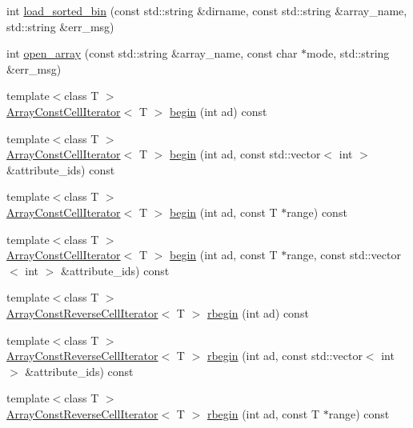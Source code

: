 \begin{DoxyCompactItemize}
\item 
int \hyperlink{classStorageManager_aa684003b8c78c5b6a13522cf47d6c7cb}{load\+\_\+sorted\+\_\+bin} (const std\+::string \&dirname, const std\+::string \&array\+\_\+name, std\+::string \&err\+\_\+msg)
\item 
int \hyperlink{classStorageManager_a566e1872beefb0b08364d03a0e82f4a7}{open\+\_\+array} (const std\+::string \&array\+\_\+name, const char $\ast$mode, std\+::string \&err\+\_\+msg)
\item 
{\footnotesize template$<$class T $>$ }\\\hyperlink{classArrayConstCellIterator}{Array\+Const\+Cell\+Iterator}$<$ T $>$ \hyperlink{classStorageManager_a4937c8bb623728447a003968edb55ce5}{begin} (int ad) const 
\item 
{\footnotesize template$<$class T $>$ }\\\hyperlink{classArrayConstCellIterator}{Array\+Const\+Cell\+Iterator}$<$ T $>$ \hyperlink{classStorageManager_a5af14b46b015d01b6a113edb781ccd38}{begin} (int ad, const std\+::vector$<$ int $>$ \&attribute\+\_\+ids) const 
\item 
{\footnotesize template$<$class T $>$ }\\\hyperlink{classArrayConstCellIterator}{Array\+Const\+Cell\+Iterator}$<$ T $>$ \hyperlink{classStorageManager_a11958acbf3550a0b6e9ca8b028b76889}{begin} (int ad, const T $\ast$range) const 
\item 
{\footnotesize template$<$class T $>$ }\\\hyperlink{classArrayConstCellIterator}{Array\+Const\+Cell\+Iterator}$<$ T $>$ \hyperlink{classStorageManager_aa32e07289e6803e99e835330afbec0de}{begin} (int ad, const T $\ast$range, const std\+::vector$<$ int $>$ \&attribute\+\_\+ids) const 
\item 
{\footnotesize template$<$class T $>$ }\\\hyperlink{classArrayConstReverseCellIterator}{Array\+Const\+Reverse\+Cell\+Iterator}$<$ T $>$ \hyperlink{classStorageManager_af4ce673fdf84d4672ff065743614078d}{rbegin} (int ad) const 
\item 
{\footnotesize template$<$class T $>$ }\\\hyperlink{classArrayConstReverseCellIterator}{Array\+Const\+Reverse\+Cell\+Iterator}$<$ T $>$ \hyperlink{classStorageManager_a9037e3c1521b947eeabee8961e392419}{rbegin} (int ad, const std\+::vector$<$ int $>$ \&attribute\+\_\+ids) const 
\item 
{\footnotesize template$<$class T $>$ }\\\hyperlink{classArrayConstReverseCellIterator}{Array\+Const\+Reverse\+Cell\+Iterator}$<$ T $>$ \hyperlink{classStorageManager_ac34c8537c5835b7e43333da973886a32}{rbegin} (int ad, const T $\ast$range) const 

\end{DoxyCompactItemize}
